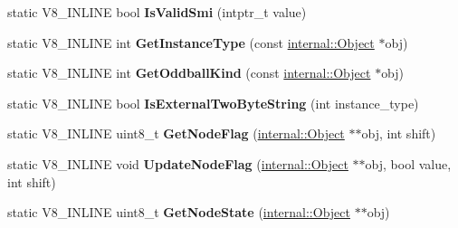 \begin{DoxyCompactItemize}
\item 
static V8\+\_\+\+I\+N\+L\+I\+NE bool {\bfseries Is\+Valid\+Smi} (intptr\+\_\+t value)\hypertarget{classv8_1_1internal_1_1_internals_a69b0abda8cf242042f4f19bcba35fd18}{}\label{classv8_1_1internal_1_1_internals_a69b0abda8cf242042f4f19bcba35fd18}

\item 
static V8\+\_\+\+I\+N\+L\+I\+NE int {\bfseries Get\+Instance\+Type} (const \hyperlink{classv8_1_1internal_1_1_object}{internal\+::\+Object} $\ast$obj)\hypertarget{classv8_1_1internal_1_1_internals_a38c4f83c21a6e6620b515e569900afaa}{}\label{classv8_1_1internal_1_1_internals_a38c4f83c21a6e6620b515e569900afaa}

\item 
static V8\+\_\+\+I\+N\+L\+I\+NE int {\bfseries Get\+Oddball\+Kind} (const \hyperlink{classv8_1_1internal_1_1_object}{internal\+::\+Object} $\ast$obj)\hypertarget{classv8_1_1internal_1_1_internals_a815059bbe1e7f23df55afed06d591b9a}{}\label{classv8_1_1internal_1_1_internals_a815059bbe1e7f23df55afed06d591b9a}

\item 
static V8\+\_\+\+I\+N\+L\+I\+NE bool {\bfseries Is\+External\+Two\+Byte\+String} (int instance\+\_\+type)\hypertarget{classv8_1_1internal_1_1_internals_afbf930e9dfde745b54e1e7e03b5b96c8}{}\label{classv8_1_1internal_1_1_internals_afbf930e9dfde745b54e1e7e03b5b96c8}

\item 
static V8\+\_\+\+I\+N\+L\+I\+NE uint8\+\_\+t {\bfseries Get\+Node\+Flag} (\hyperlink{classv8_1_1internal_1_1_object}{internal\+::\+Object} $\ast$$\ast$obj, int shift)\hypertarget{classv8_1_1internal_1_1_internals_aa7df51a3da3e021e2bd4426461e6d1fb}{}\label{classv8_1_1internal_1_1_internals_aa7df51a3da3e021e2bd4426461e6d1fb}

\item 
static V8\+\_\+\+I\+N\+L\+I\+NE void {\bfseries Update\+Node\+Flag} (\hyperlink{classv8_1_1internal_1_1_object}{internal\+::\+Object} $\ast$$\ast$obj, bool value, int shift)\hypertarget{classv8_1_1internal_1_1_internals_a868ffed15d660ac6959597e45a353d6e}{}\label{classv8_1_1internal_1_1_internals_a868ffed15d660ac6959597e45a353d6e}

\item 
static V8\+\_\+\+I\+N\+L\+I\+NE uint8\+\_\+t {\bfseries Get\+Node\+State} (\hyperlink{classv8_1_1internal_1_1_object}{internal\+::\+Object} $\ast$$\ast$obj)\hypertarget{classv8_1_1internal_1_1_internals_a76c388eb1d813144512b0af2d1c5ac7b}{}\label{classv8_1_1internal_1_1_internals_a76c388eb1d813144512b0af2d1c5ac7b}


\end{DoxyCompactItemize}
